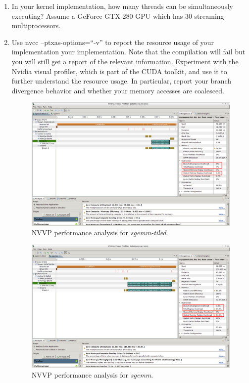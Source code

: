 \documentclass[a4paper,10pt]{scrartcl}
\begin{document}
\begin{enumerate}
 \item In your kernel implementation, how many threads can be simultaneously executing? Assume a GeForce GTX 280 GPU which has 30 streaming multiprocessors.
 
 \item Use nvcc --ptxas-options=``-v'' to report the resource usage of your implementation your implementation.  Note that the compilation will fail but you will still get a report of the relevant information.  Experiment with the Nvidia visual profiler, which is part of the CUDA toolkit, and use it to further understand the resource usage.  In particular, report your branch divergence behavior and whether your memory accesses are coalesced. 
 
 \begin{figure}
 \centering
 \includegraphics[width=\textwidth]{./profile_sgemm-tiled.png}
 \caption{NVVP performance analysis for \textit{sgemm-tiled}.}\label{fig:profile_sgemm-tiled}
 \end{figure}

 \begin{figure}
 \centering
 \includegraphics[width=\textwidth]{./profile_sgemm.png}
 \caption{NVVP performance analysis for \textit{sgemm}.}\label{fig:profile_sgemm}
 \end{figure}
 

\end{enumerate}
\end{document}
